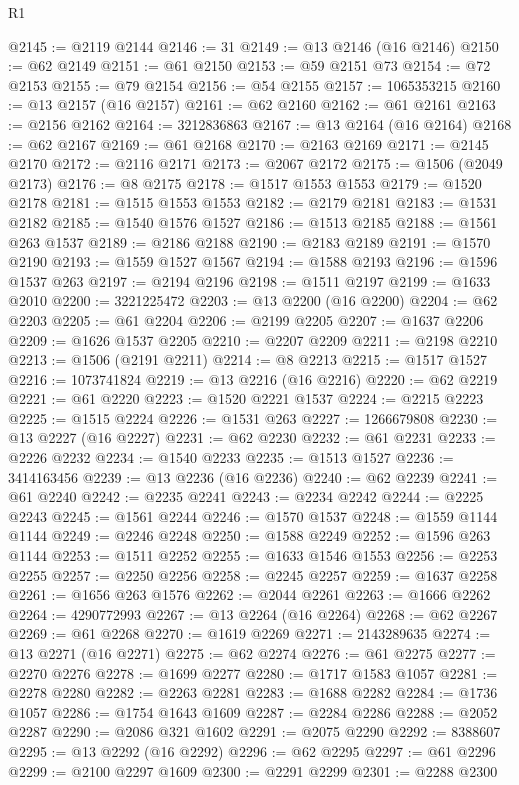 \begin{lexlean}{R1}
\begin{coremodule}
@2145 := @2119 @2144
@2146 := 31
@2149 := @13 @2146 (@16 @2146)
@2150 := @62 @2149
@2151 := @61 @2150
@2153 := @59 @2151 @73
@2154 := @72 @2153
@2155 := @79 @2154
@2156 := @54 @2155
@2157 := 1065353215
@2160 := @13 @2157 (@16 @2157)
@2161 := @62 @2160
@2162 := @61 @2161
@2163 := @2156 @2162
@2164 := 3212836863
@2167 := @13 @2164 (@16 @2164)
@2168 := @62 @2167
@2169 := @61 @2168
@2170 := @2163 @2169
@2171 := @2145 @2170
@2172 := @2116 @2171
@2173 := @2067 @2172
@2175 := @1506 (@2049 @2173)
@2176 := @8 @2175
@2178 := @1517 @1553 @1553
@2179 := @1520 @2178
@2181 := @1515 @1553 @1553
@2182 := @2179 @2181
@2183 := @1531 @2182
@2185 := @1540 @1576 @1527
@2186 := @1513 @2185
@2188 := @1561 @263 @1537
@2189 := @2186 @2188
@2190 := @2183 @2189
@2191 := @1570 @2190
@2193 := @1559 @1527 @1567
@2194 := @1588 @2193
@2196 := @1596 @1537 @263
@2197 := @2194 @2196
@2198 := @1511 @2197
@2199 := @1633 @2010
@2200 := 3221225472
@2203 := @13 @2200 (@16 @2200)
@2204 := @62 @2203
@2205 := @61 @2204
@2206 := @2199 @2205
@2207 := @1637 @2206
@2209 := @1626 @1537 @2205
@2210 := @2207 @2209
@2211 := @2198 @2210
@2213 := @1506 (@2191 @2211)
@2214 := @8 @2213
@2215 := @1517 @1527
@2216 := 1073741824
@2219 := @13 @2216 (@16 @2216)
@2220 := @62 @2219
@2221 := @61 @2220
@2223 := @1520 @2221 @1537
@2224 := @2215 @2223
@2225 := @1515 @2224
@2226 := @1531 @263
@2227 := 1266679808
@2230 := @13 @2227 (@16 @2227)
@2231 := @62 @2230
@2232 := @61 @2231
@2233 := @2226 @2232
@2234 := @1540 @2233
@2235 := @1513 @1527
@2236 := 3414163456
@2239 := @13 @2236 (@16 @2236)
@2240 := @62 @2239
@2241 := @61 @2240
@2242 := @2235 @2241
@2243 := @2234 @2242
@2244 := @2225 @2243
@2245 := @1561 @2244
@2246 := @1570 @1537
@2248 := @1559 @1144 @1144
@2249 := @2246 @2248
@2250 := @1588 @2249
@2252 := @1596 @263 @1144
@2253 := @1511 @2252
@2255 := @1633 @1546 @1553
@2256 := @2253 @2255
@2257 := @2250 @2256
@2258 := @2245 @2257
@2259 := @1637 @2258
@2261 := @1656 @263 @1576
@2262 := @2044 @2261
@2263 := @1666 @2262
@2264 := 4290772993
@2267 := @13 @2264 (@16 @2264)
@2268 := @62 @2267
@2269 := @61 @2268
@2270 := @1619 @2269
@2271 := 2143289635
@2274 := @13 @2271 (@16 @2271)
@2275 := @62 @2274
@2276 := @61 @2275
@2277 := @2270 @2276
@2278 := @1699 @2277
@2280 := @1717 @1583 @1057
@2281 := @2278 @2280
@2282 := @2263 @2281
@2283 := @1688 @2282
@2284 := @1736 @1057
@2286 := @1754 @1643 @1609
@2287 := @2284 @2286
@2288 := @2052 @2287
@2290 := @2086 @321 @1602
@2291 := @2075 @2290
@2292 := 8388607
@2295 := @13 @2292 (@16 @2292)
@2296 := @62 @2295
@2297 := @61 @2296
@2299 := @2100 @2297 @1609
@2300 := @2291 @2299
@2301 := @2288 @2300

\end{coremodule}
\end{lexlean}
